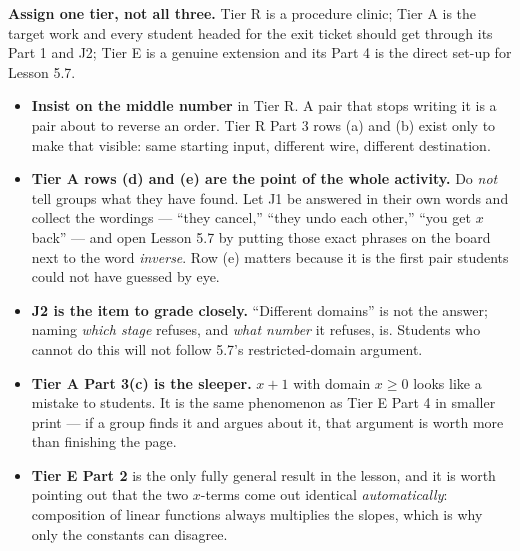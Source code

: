 \documentclass[10pt]{article}
\begin{document}
\begin{teachernote}
\small \textbf{Assign one tier, not all three.} Tier R is a procedure clinic; Tier A is the target
work and every student headed for the exit ticket should get through its Part 1 and J2; Tier E is a
genuine extension and its Part 4 is the direct set-up for Lesson 5.7.
\begin{itemize}[leftmargin=1.3em, nosep]
  \item \textbf{Insist on the middle number} in Tier R. A pair that stops writing it is a pair about
        to reverse an order. Tier R Part 3 rows (a) and (b) exist only to make that visible: same
        starting input, different wire, different destination.
  \item \textbf{Tier A rows (d) and (e) are the point of the whole activity.} Do \emph{not} tell
        groups what they have found. Let J1 be answered in their own words and collect the wordings
        --- ``they cancel,'' ``they undo each other,'' ``you get $x$ back'' --- and open Lesson 5.7
        by putting those exact phrases on the board next to the word \emph{inverse}. Row (e) matters
        because it is the first pair students could not have guessed by eye.
  \item \textbf{J2 is the item to grade closely.} ``Different domains'' is not the answer; naming
        \emph{which stage} refuses, and \emph{what number} it refuses, is. Students who cannot do
        this will not follow 5.7's restricted-domain argument.
  \item \textbf{Tier A Part 3(c) is the sleeper.} $x+1$ with domain $x\ge0$ looks like a mistake to
        students. It is the same phenomenon as Tier E Part 4 in smaller print --- if a group finds
        it and argues about it, that argument is worth more than finishing the page.
  \item \textbf{Tier E Part 2} is the only fully general result in the lesson, and it is worth
        pointing out that the two $x$-terms come out identical \emph{automatically}: composition of
        linear functions always multiplies the slopes, which is why only the constants can disagree.
\end{itemize}
\end{teachernote}
\end{document}
